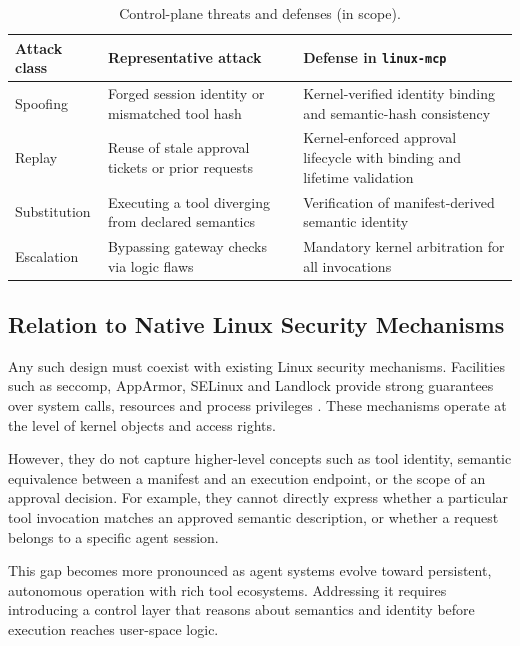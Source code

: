 \begin{table}[t]
\centering
\small
\begin{tabular}{l p{4.8cm} p{5.2cm}}
\toprule
\textbf{Attack class} & \textbf{Representative attack} & \textbf{Defense in \texttt{linux-mcp}} \\
\midrule

Spoofing 
& Forged session identity or mismatched tool hash 
& Kernel-verified identity binding and semantic-hash consistency \\

Replay 
& Reuse of stale approval tickets or prior requests 
& Kernel-enforced approval lifecycle with binding and lifetime validation \\

Substitution 
& Executing a tool diverging from declared semantics 
& Verification of manifest-derived semantic identity \\

Escalation 
& Bypassing gateway checks via logic flaws 
& Mandatory kernel arbitration for all invocations \\

\bottomrule
\end{tabular}
\caption{Control-plane threats and defenses (in scope).}
\label{tab:threat_in_scope}
\end{table}



\subsection{Relation to Native Linux Security Mechanisms}

Any such design must coexist with existing Linux security mechanisms. Facilities such as seccomp, AppArmor, SELinux and Landlock provide strong guarantees over system calls, resources and process privileges \cite{seccomp2026,lsm2026,apparmor2026,selinux2026,landlock2026}. 
These mechanisms operate at the level of kernel objects and access rights.

However, they do not capture higher-level concepts such as tool identity, semantic equivalence between a manifest and an execution endpoint, or the scope of an approval decision. 
For example, they cannot directly express whether a particular tool invocation matches an approved semantic description, or whether a request belongs to a specific agent session.

This gap becomes more pronounced as agent systems evolve toward persistent, autonomous operation with rich tool ecosystems.
Addressing it requires introducing a control layer that reasons about semantics and identity before execution reaches user-space logic.



